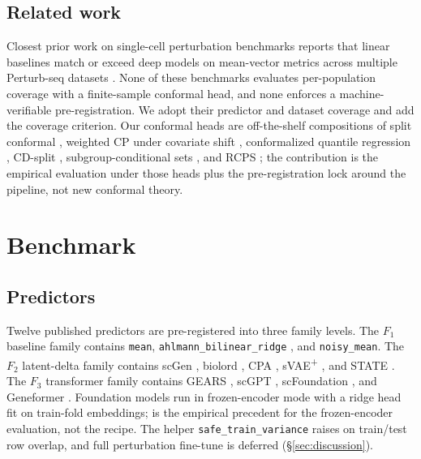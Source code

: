 \documentclass{article}
\begin{document}
\subsection{Related work}
Closest prior work on single-cell perturbation benchmarks reports
that linear baselines match or exceed deep models on mean-vector
metrics across multiple Perturb-seq datasets
\cite{ahlmann2025deep,csendes2025train,kedzierska2025zeroshot,boiarsky2024deeper}.
None of these benchmarks evaluates per-population coverage with a
finite-sample conformal head, and none enforces a machine-verifiable
pre-registration. We adopt their predictor and dataset coverage and
add the coverage criterion. Our conformal heads are off-the-shelf
compositions of split conformal \cite{vovk2012}, weighted CP under
covariate shift \cite{tibshirani2019}, conformalized quantile
regression \cite{romano2019}, CD-split \cite{izbicki2022},
subgroup-conditional sets \cite{cauchois2021}, and RCPS
\cite{bates2021}; the contribution is the empirical evaluation under
those heads plus the pre-registration lock around the pipeline, not
new conformal theory.

\section{Benchmark}
\label{sec:benchmark}
\subsection{Predictors}
Twelve published predictors are pre-registered into three family
levels. The $F_1$ baseline family contains \texttt{mean},
\texttt{ahlmann\_bilinear\_ridge} \cite{ahlmann2025deep}, and
\texttt{noisy\_mean}. The $F_2$ latent-delta family contains scGen
\cite{lotfollahi2019scgen}, biolord \cite{piran2024biolord}, CPA
\cite{lotfollahi2023cpa}, sVAE\textsuperscript{+} \cite{bereket2023},
and STATE \cite{adduri2025state}. The $F_3$ transformer family
contains GEARS \cite{roohani2024gears}, scGPT \cite{cui2024scgpt},
scFoundation \cite{hao2023scfoundation}, and Geneformer
\cite{theodoris2023geneformer}. Foundation models run in
frozen-encoder mode with a ridge head fit on train-fold embeddings;
\citet{csendes2025train} is the empirical precedent for the
frozen-encoder evaluation, not the recipe. The helper
\texttt{safe\_train\_variance} raises on train/test row overlap, and
full perturbation fine-tune is deferred (\S\ref{sec:discussion}).
\end{document}

